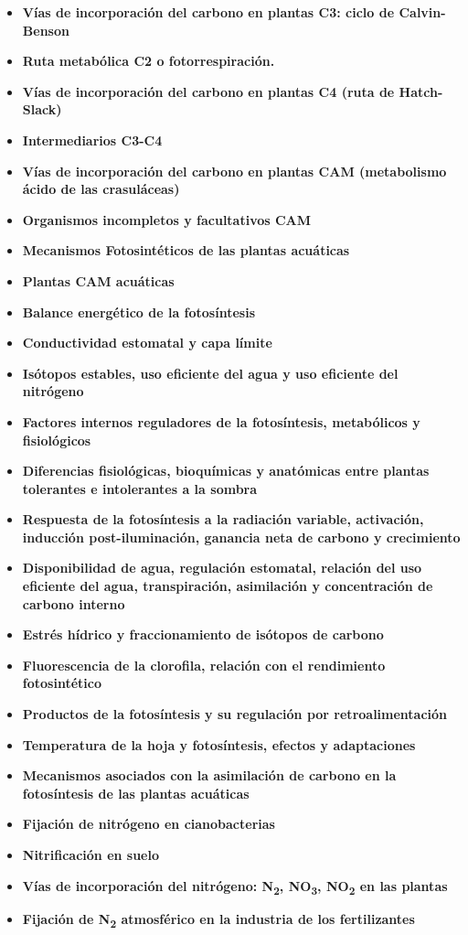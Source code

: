 \documentclass[
]{article}
\begin{document}
\begin{itemize}
\item
  \textbf{Vías de incorporación del carbono en plantas C3: ciclo de
  Calvin-Benson}
\item
  \textbf{Ruta metabólica C2 o fotorrespiración.}
\item
  \textbf{Vías de incorporación del carbono en plantas C4 (ruta de
  Hatch-Slack)}
\item
  \textbf{Intermediarios C3-C4}
\item
  \textbf{Vías de incorporación del carbono en plantas CAM (metabolismo
  ácido de las crasuláceas)}
\item
  \textbf{Organismos incompletos y facultativos CAM}
\item
  \textbf{Mecanismos Fotosintéticos de las plantas acuáticas}
\item
  \textbf{Plantas CAM acuáticas}
\item
  \textbf{Balance energético de la fotosíntesis}
\item
  \textbf{Conductividad estomatal y capa límite}
\item
  \textbf{Isótopos estables, uso eficiente del agua y uso eficiente del
  nitrógeno}
\item
  \textbf{Factores internos reguladores de la fotosíntesis, metabólicos
  y fisiológicos}
\item
  \textbf{Diferencias fisiológicas, bioquímicas y anatómicas entre
  plantas tolerantes e intolerantes a la sombra}
\item
  \textbf{Respuesta de la fotosíntesis a la radiación variable,
  activación, inducción post-iluminación, ganancia neta de carbono y
  crecimiento}
\item
  \textbf{Disponibilidad de agua, regulación estomatal, relación del uso
  eficiente del agua, transpiración, asimilación y concentración de
  carbono interno}
\item
  \textbf{Estrés hídrico y fraccionamiento de isótopos de carbono}
\item
  \textbf{Fluorescencia de la clorofila, relación con el rendimiento
  fotosintético}
\item
  \textbf{Productos de la fotosíntesis y su regulación por
  retroalimentación}
\item
  \textbf{Temperatura de la hoja y fotosíntesis, efectos y adaptaciones}
\item
  \textbf{Mecanismos asociados con la asimilación de carbono en la
  fotosíntesis de las plantas acuáticas}
\item
  \textbf{Fijación de nitrógeno en cianobacterias}
\item
  \textbf{Nitrificación en suelo}
\item
  \textbf{Vías de incorporación del nitrógeno: N\textsubscript{2},
  NO\textsubscript{3}, NO\textsubscript{2} en las plantas}
\item
  \textbf{Fijación de N\textsubscript{2} atmosférico en la industria de
  los fertilizantes}
\end{itemize}
\end{document}
